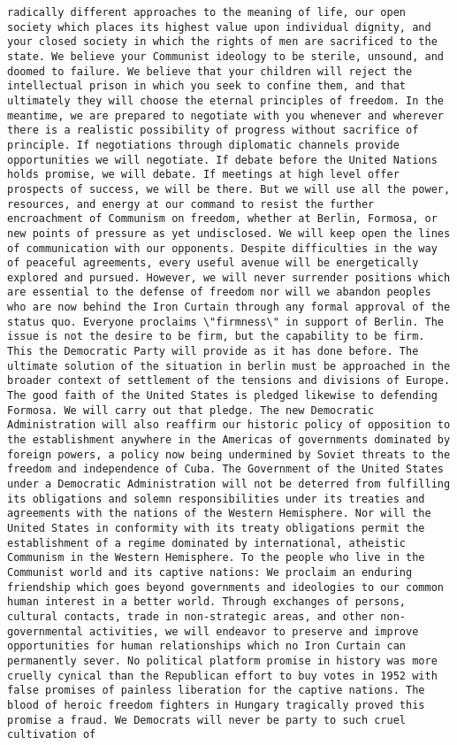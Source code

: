 \documentclass[
]{article}
\begin{document}
\begin{verbatim}
radically different approaches to the meaning of life, our open society which places its highest value upon individual dignity, and your closed society in which the rights of men are sacrificed to the state. We believe your Communist ideology to be sterile, unsound, and doomed to failure. We believe that your children will reject the intellectual prison in which you seek to confine them, and that ultimately they will choose the eternal principles of freedom. In the meantime, we are prepared to negotiate with you whenever and wherever there is a realistic possibility of progress without sacrifice of principle. If negotiations through diplomatic channels provide opportunities we will negotiate. If debate before the United Nations holds promise, we will debate. If meetings at high level offer prospects of success, we will be there. But we will use all the power, resources, and energy at our command to resist the further encroachment of Communism on freedom, whether at Berlin, Formosa, or new points of pressure as yet undisclosed. We will keep open the lines of communication with our opponents. Despite difficulties in the way of peaceful agreements, every useful avenue will be energetically explored and pursued. However, we will never surrender positions which are essential to the defense of freedom nor will we abandon peoples who are now behind the Iron Curtain through any formal approval of the status quo. Everyone proclaims \"firmness\" in support of Berlin. The issue is not the desire to be firm, but the capability to be firm. This the Democratic Party will provide as it has done before. The ultimate solution of the situation in berlin must be approached in the broader context of settlement of the tensions and divisions of Europe. The good faith of the United States is pledged likewise to defending Formosa. We will carry out that pledge. The new Democratic Administration will also reaffirm our historic policy of opposition to the establishment anywhere in the Americas of governments dominated by foreign powers, a policy now being undermined by Soviet threats to the freedom and independence of Cuba. The Government of the United States under a Democratic Administration will not be deterred from fulfilling its obligations and solemn responsibilities under its treaties and agreements with the nations of the Western Hemisphere. Nor will the United States in conformity with its treaty obligations permit the establishment of a regime dominated by international, atheistic Communism in the Western Hemisphere. To the people who live in the Communist world and its captive nations: We proclaim an enduring friendship which goes beyond governments and ideologies to our common human interest in a better world. Through exchanges of persons, cultural contacts, trade in non-strategic areas, and other non-governmental activities, we will endeavor to preserve and improve opportunities for human relationships which no Iron Curtain can permanently sever. No political platform promise in history was more cruelly cynical than the Republican effort to buy votes in 1952 with false promises of painless liberation for the captive nations. The blood of heroic freedom fighters in Hungary tragically proved this promise a fraud. We Democrats will never be party to such cruel cultivation of 
\end{verbatim}
\end{document}
